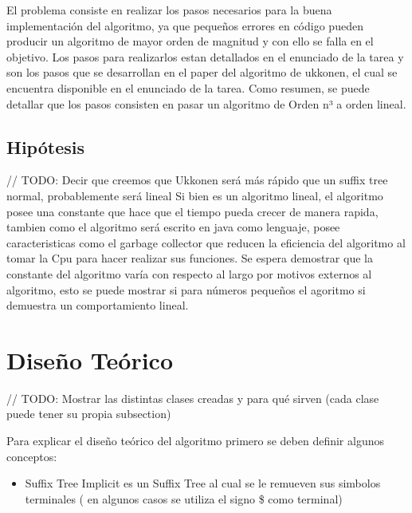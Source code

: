 \documentclass[letterpaper,10pt]{article}
\begin{document}
	El problema consiste en realizar los pasos necesarios para la buena implementación del algoritmo, ya que pequeños errores en código pueden producir un algoritmo de mayor orden de magnitud
	y con ello se falla en el objetivo. Los pasos para realizarlos estan detallados en el enunciado de la tarea y son los pasos que se desarrollan en el paper del algoritmo de ukkonen, el cual
	se encuentra disponible en el enunciado de la tarea. Como resumen, se puede detallar que los pasos consisten en pasar un algoritmo de Orden n³ a orden lineal.

	\subsection{Hipótesis}

	// TODO: Decir que creemos que Ukkonen será más rápido que un suffix tree normal, probablemente será lineal
	Si bien es un algoritmo lineal, el algoritmo posee una constante que hace que el tiempo pueda crecer de manera rapida, tambien como el algoritmo será escrito en java como lenguaje,
	posee caracteristicas como el garbage collector que reducen la eficiencia del algoritmo al tomar la Cpu para hacer realizar sus funciones. Se espera demostrar que la constante del algoritmo
	varía con respecto al largo por motivos externos al algoritmo, esto se puede mostrar si para números pequeños el agoritmo si demuestra un comportamiento lineal.

	\newpage


	\section{Diseño Teórico}

	// TODO: Mostrar las distintas clases creadas y para qué sirven (cada clase puede tener su propia subsection)

	Para explicar el diseño teórico del algoritmo primero se deben definir algunos conceptos:
	\begin{itemize}
		\item Suffix Tree Implicit es un Suffix Tree al cual se le remueven sus simbolos terminales ( en algunos casos se utiliza el signo \$ como terminal)
	\end{itemize}
\end{document}
